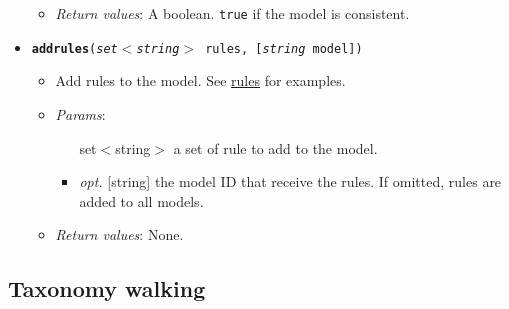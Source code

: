 \begin{itemize}
\begin{itemize}
\item  \emph{Return values}: A boolean. \texttt{true} if the model is consistent.
\end{itemize}

\item  \texttt{\textbf{addrules}(\emph{set$<$string$>$} rules, [\emph{string} model])}
\begin{itemize}
\item  Add rules to the model. See \hyperref[a4f86f7bfc24194b276c22e0ef158197]{rules} for examples.
\item  \emph{Params}:
\begin{itemize}
\item  [set$<$string$>$] a set of rule to add to the model.
\item  \emph{opt.} [string] the model ID that receive the rules. If omitted, rules are added to all models. 
\end{itemize}

\item  \emph{Return values}: None.
\end{itemize}

\end{itemize}

\subsection{Taxonomy walking}



